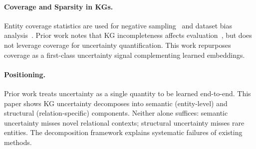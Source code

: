 \paragraph{Coverage and Sparsity in KGs.}
Entity coverage statistics are used for negative sampling~\citep{sun2019rotate} and dataset bias analysis~\citep{toutanova2015observed,akrami2020realistic}.
Prior work notes that KG incompleteness affects evaluation~\citep{safavi2020codex}, but does not leverage coverage for uncertainty quantification.
This work repurposes coverage as a first-class uncertainty signal complementing learned embeddings.

\paragraph{Positioning.}
Prior work treats uncertainty as a single quantity to be learned end-to-end.
This paper shows KG uncertainty decomposes into semantic (entity-level) and structural (relation-specific) components.
Neither alone suffices: semantic uncertainty misses novel relational contexts; structural uncertainty misses rare entities.
The decomposition framework explains systematic failures of existing methods.
